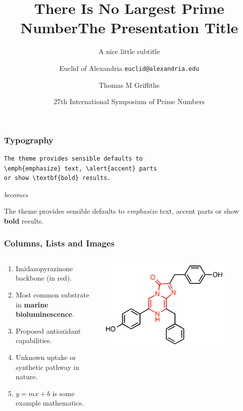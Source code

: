 \documentclass[aspectratio=169]{beamer}
\title{There Is No Largest Prime Number}
\date[ISPN ’80]{27th International Symposium of Prime Numbers}
\author[Euclid]{Euclid of Alexandria \texttt{euclid@alexandria.edu}}
\title{The Presentation Title}
\subtitle{A nice little subtitle}
\author[Thomas]{Thomas M Griffiths}
\institute{School of Chemistry}
\date{}
\begin{document}
\maketitle

\begin{frame}[fragile]
\frametitle{Typography}
\begin{verbatim}
The theme provides sensible defaults to 
\emph{emphasize} text, \alert{accent} parts 
or show \textbf{bold} results.
\end{verbatim}
\begin{center} \textit{becomes} \end{center}
The theme provides sensible defaults to \emph{emphasize} text, \alert{accent} parts or show \textbf{bold} results.
\end{frame}

\begin{frame}
   \frametitle{Columns, Lists and Images}
   \begin{columns}
      \begin{column}{0.5\textwidth}
         \begin{enumerate}
            \item Imidazopyrazinone backbone (in red).
            \item Most common substrate in \textbf{marine bioluminescence}.
            \item Proposed antioxidant capabilities.
            \item Unknown uptake or synthetic pathway in nature.
            \item $y=mx+b$ is some example mathematics.
         \end{enumerate}
      \end{column}
      \begin{column}{0.5\textwidth}
         \centering
         \includegraphics[width=0.8\textwidth]{coelenterazine.png}
      \end{column}
   \end{columns}
\end{frame}
\end{document}
